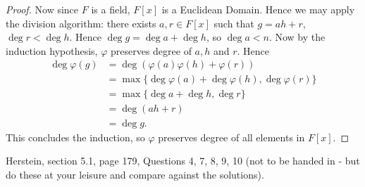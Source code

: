 \begin{itemize}
\begin{proof}
	Now since $F$ is a field, $F[x]$ is a Euclidean Domain. Hence we may apply the division algorithm: there exists $a, r \in F[x]$ such that $g = a h + r$, $\operatorname{deg} r < \operatorname{deg} h$. Hence $\operatorname{deg} g = \operatorname{deg} a + \operatorname{deg}  h$, so $\operatorname{deg}  a < n$. Now by the induction hypothesis,  $\varphi$ preserves degree of $a, h $ and $r$. Hence
	\begin{align*}
		\operatorname{deg} \varphi(g) &= \operatorname{deg} \left( \varphi(a)\varphi(h) + \varphi(r) \right) \\
		&= \max \{\operatorname{deg} \varphi(a) + \operatorname{deg} \varphi(h), \operatorname{deg} \varphi(r)\}\\
		&= \max \{\operatorname{deg} a + \operatorname{deg} h, \operatorname{deg} r\}\\
		&= \operatorname{deg} (ah+r) \\
		&= \operatorname{deg} g  
	.\end{align*} 
	This concludes the induction, so $\varphi$ preserves degree of all elements in $F[x] $.
\end{proof}

\end{itemize}
Herstein, section 5.1, page 179, Questions 4, 7, 8, 9, 10 (not to be handed in - but do these at your leisure and compare against the solutions).

